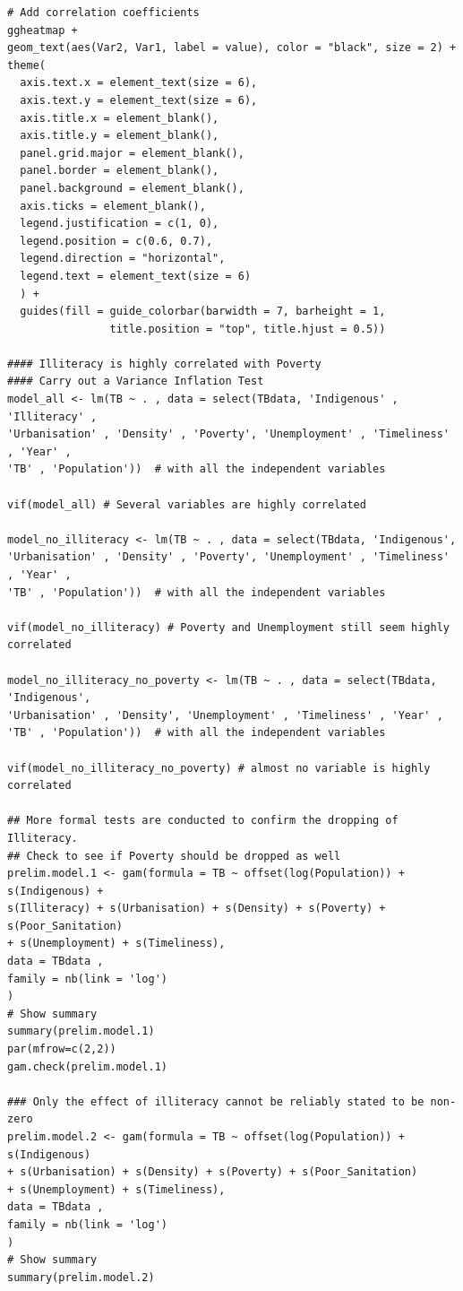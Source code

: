 \documentclass{article}
\begin{document}
\begin{verbatim}
# Add correlation coefficients
ggheatmap +
geom_text(aes(Var2, Var1, label = value), color = "black", size = 2) +
theme(
  axis.text.x = element_text(size = 6),
  axis.text.y = element_text(size = 6),
  axis.title.x = element_blank(),
  axis.title.y = element_blank(),
  panel.grid.major = element_blank(),
  panel.border = element_blank(),
  panel.background = element_blank(),
  axis.ticks = element_blank(),
  legend.justification = c(1, 0),
  legend.position = c(0.6, 0.7),
  legend.direction = "horizontal",
  legend.text = element_text(size = 6)
  ) + 
  guides(fill = guide_colorbar(barwidth = 7, barheight = 1,
                title.position = "top", title.hjust = 0.5))

#### Illiteracy is highly correlated with Poverty
#### Carry out a Variance Inflation Test
model_all <- lm(TB ~ . , data = select(TBdata, 'Indigenous' , 'Illiteracy' , 
'Urbanisation' , 'Density' , 'Poverty', 'Unemployment' , 'Timeliness' , 'Year' ,
'TB' , 'Population'))  # with all the independent variables

vif(model_all) # Several variables are highly correlated

model_no_illiteracy <- lm(TB ~ . , data = select(TBdata, 'Indigenous', 
'Urbanisation' , 'Density' , 'Poverty', 'Unemployment' , 'Timeliness' , 'Year' ,
'TB' , 'Population'))  # with all the independent variables

vif(model_no_illiteracy) # Poverty and Unemployment still seem highly correlated

model_no_illiteracy_no_poverty <- lm(TB ~ . , data = select(TBdata, 'Indigenous', 
'Urbanisation' , 'Density', 'Unemployment' , 'Timeliness' , 'Year' ,
'TB' , 'Population'))  # with all the independent variables

vif(model_no_illiteracy_no_poverty) # almost no variable is highly correlated

## More formal tests are conducted to confirm the dropping of Illiteracy.
## Check to see if Poverty should be dropped as well
prelim.model.1 <- gam(formula = TB ~ offset(log(Population)) + s(Indigenous) + 
s(Illiteracy) + s(Urbanisation) + s(Density) + s(Poverty) + s(Poor_Sanitation)
+ s(Unemployment) + s(Timeliness),
data = TBdata , 
family = nb(link = 'log')
)
# Show summary
summary(prelim.model.1)
par(mfrow=c(2,2))
gam.check(prelim.model.1)

### Only the effect of illiteracy cannot be reliably stated to be non-zero
prelim.model.2 <- gam(formula = TB ~ offset(log(Population)) + s(Indigenous) 
+ s(Urbanisation) + s(Density) + s(Poverty) + s(Poor_Sanitation)
+ s(Unemployment) + s(Timeliness),
data = TBdata , 
family = nb(link = 'log')
)
# Show summary
summary(prelim.model.2)


\end{verbatim}
\end{document}
